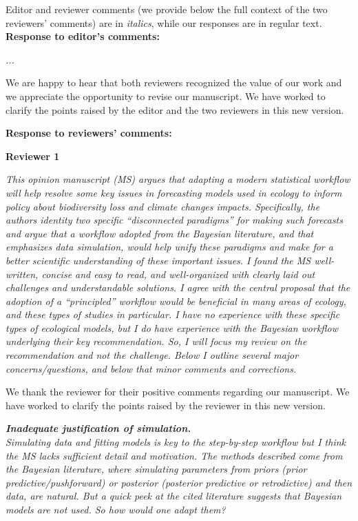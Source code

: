 \documentclass[11pt,letter]{article}
\begin{document}
\setlength{\parindent}{0cm}
\setlength{\parskip}{7pt}

Editor and reviewer comments (we provide below the full context of the two reviewers' comments) are in \emph{italics}, while our responses are in regular text. \\ 

{\bf Response to editor's comments:} 

\begin{mybox}
\emph{...}
\end{mybox}

We are happy to hear that both reviewers recognized the value of our work and we appreciate the opportunity to revise our manuscript. We have worked to clarify the points raised by the editor and the two reviewers in this new version.

{\bf Response to reviewers' comments:} 

{\bf Reviewer 1}

\begin{mybox}
\emph{This opinion manuscript (MS) argues that adapting a modern statistical workflow will help resolve some key issues in forecasting models used in ecology to inform policy about biodiversity loss and climate changes impacts. Specifically, the authors identity two specific “disconnected paradigms” for making such forecasts and argue that a workflow adopted from the Bayesian literature, and that emphasizes data simulation, would help unify these paradigms and make for a better scientific understanding of these important issues. I found the MS well-written, concise and easy to read, and well-organized with clearly laid out challenges and understandable solutions. I agree with the central proposal that the adoption of a “principled” workflow would be beneficial in many areas of ecology, and these types of studies in particular. I have no experience with these specific types of ecological models, but I do have experience with the Bayesian workflow underlying their key recommendation. So, I will focus my review on the recommendation and not the challenge. Below I outline several major concerns/questions, and below that minor comments and corrections.}
\end{mybox}

We thank the reviewer for their positive comments regarding our manuscript. 
We have worked to clarify the points raised by the reviewer in this new version.

\begin{mybox}
\emph{\textbf{Inadequate justification of simulation.}\\
Simulating data and fitting models is key to the step-by-step workflow but I think the MS lacks sufficient detail and motivation. The methods described come from the Bayesian literature, where simulating parameters from priors (prior predictive/pushforward) or posterior (posterior predictive or retrodictive) and then data, are natural. But a quick peek at the cited literature suggests that Bayesian models are not used. So how would one adapt them?}
\end{mybox}
\end{document}
